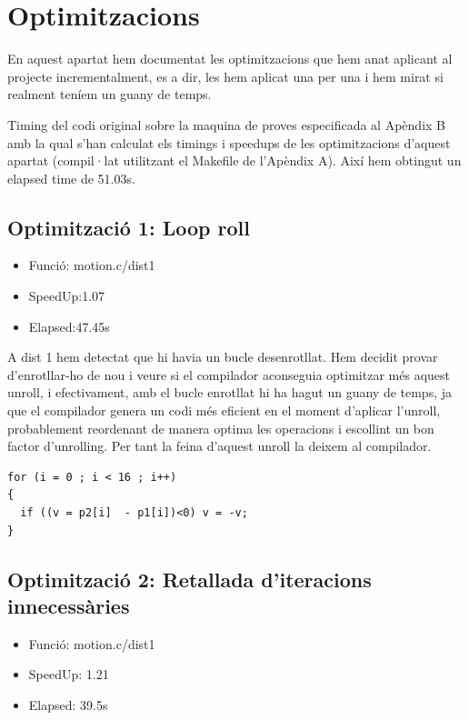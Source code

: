 

\chapter{Optimitzacions}

En aquest apartat hem documentat les optimitzacions que hem anat aplicant al projecte incrementalment, es a dir, les hem aplicat una per una i hem mirat si realment teníem un guany de temps. 

Timing del codi original sobre la maquina de proves especificada al Apèndix B amb la qual s'han calculat els timings i speedups de les optimitzacions d'aquest apartat (compil·lat utilitzant el Makefile de l'Apèndix A). Així hem obtingut un elapsed time de 51.03s.


\section{Optimitzaci\'o 1: Loop roll}
\begin{itemize}
\item{Funció: motion.c/dist1}
\item{SpeedUp:1.07}
\item{Elapsed:47.45s}
\end{itemize}

A dist 1 hem detectat que hi havia un bucle desenrotllat. Hem decidit provar d'enrotllar-ho de nou i veure si el compilador aconseguia optimitzar més aquest unroll, i efectivament, amb el bucle enrotllat hi ha hagut un guany de temps, ja que el compilador genera un codi més eficient en el moment d'aplicar l'unroll, probablement reordenant de manera optima les operacions i escollint un bon factor d'unrolling. Per tant la feina d'aquest unroll la deixem al compilador.

\begin{lstlisting}
for (i = 0 ; i < 16 ; i++)
{
  if ((v = p2[i]  - p1[i])<0) v = -v;
}
\end{lstlisting}
 
\section{Optimitzaci\'o 2: Retallada d'iteracions innecess\`aries}
\begin{itemize}
\item{Funció: motion.c/dist1}
\item{SpeedUp: 1.21}
\item{Elapsed: 39.5s}
\end{itemize}

